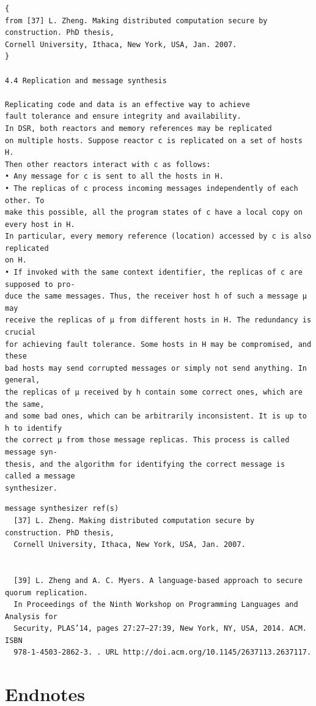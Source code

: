 \documentclass[dvipsnames]{article}
\theoremstyle{definition}
\begin{document}
\begin{verbatim}
{
from [37] L. Zheng. Making distributed computation secure by construction. PhD thesis,
Cornell University, Ithaca, New York, USA, Jan. 2007.
}

4.4 Replication and message synthesis

Replicating code and data is an effective way to achieve
fault tolerance and ensure integrity and availability.
In DSR, both reactors and memory references may be replicated
on multiple hosts. Suppose reactor c is replicated on a set of hosts H.
Then other reactors interact with c as follows:
• Any message for c is sent to all the hosts in H.
• The replicas of c process incoming messages independently of each other. To
make this possible, all the program states of c have a local copy on every host in H.
In particular, every memory reference (location) accessed by c is also replicated
on H.
• If invoked with the same context identifier, the replicas of c are supposed to pro-
duce the same messages. Thus, the receiver host h of such a message µ may
receive the replicas of µ from different hosts in H. The redundancy is crucial
for achieving fault tolerance. Some hosts in H may be compromised, and these
bad hosts may send corrupted messages or simply not send anything. In general,
the replicas of µ received by h contain some correct ones, which are the same,
and some bad ones, which can be arbitrarily inconsistent. It is up to h to identify
the correct µ from those message replicas. This process is called message syn-
thesis, and the algorithm for identifying the correct message is called a message
synthesizer.
\end{verbatim}

\begin{verbatim}
message synthesizer ref(s)
  [37] L. Zheng. Making distributed computation secure by construction. PhD thesis,
  Cornell University, Ithaca, New York, USA, Jan. 2007.


  [39] L. Zheng and A. C. Myers. A language-based approach to secure quorum replication.
  In Proceedings of the Ninth Workshop on Programming Languages and Analysis for
  Security, PLAS’14, pages 27:27–27:39, New York, NY, USA, 2014. ACM. ISBN
  978-1-4503-2862-3. . URL http://doi.acm.org/10.1145/2637113.2637117.
\end{verbatim}

\section{Endnotes}
\printendnotes
\end{document}

